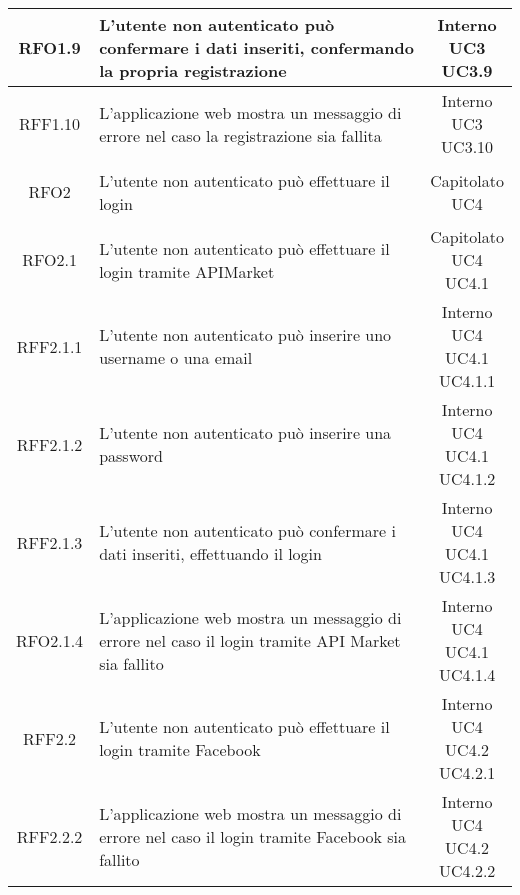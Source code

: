 \begin{longtable}{|c|p{8cm}|c|}
\hline
\hypertarget{RFO1.9}{RFO1.9} & L'utente non autenticato può confermare i dati inseriti, confermando la propria registrazione & \makecell*{Interno\\UC3\\UC3.9} \\
\hline
\hypertarget{RFF1.10}{RFF1.10} & L'applicazione web mostra un messaggio di errore nel caso la registrazione sia fallita & \makecell*{Interno\\UC3\\UC3.10} \\
\hline

\hypertarget{RFO2}{RFO2} & L'utente non autenticato può effettuare il login & \makecell*{Capitolato\\UC4} \\
\hline

\hypertarget{RFO2.1}{RFO2.1} & L'utente non autenticato può effettuare il login tramite APIMarket & \makecell*{Capitolato\\UC4\\UC4.1} \\
\hline

\hypertarget{RFF2.1.1}{RFF2.1.1} & L'utente non autenticato può inserire uno username o una email & \makecell*{Interno\\UC4\\UC4.1\\UC4.1.1} \\
\hline
\hypertarget{RFF2.1.2}{RFF2.1.2} & L'utente non autenticato può inserire una password & \makecell*{Interno\\UC4\\UC4.1\\UC4.1.2} \\
\hline
\hypertarget{RFF2.1.3}{RFF2.1.3} & L'utente non autenticato può confermare i dati inseriti, effettuando il login & \makecell*{Interno\\UC4\\UC4.1\\UC4.1.3} \\
\hline
\hypertarget{RFO2.1.4}{RFO2.1.4} & L'applicazione web mostra un messaggio di errore nel caso il login tramite API Market sia fallito & \makecell*{Interno\\UC4\\UC4.1\\UC4.1.4} \\
\hline

\hypertarget{RFF2.2}{RFF2.2} & L'utente non autenticato può effettuare il login tramite Facebook & \makecell*{Interno\\UC4\\UC4.2\\UC4.2.1} \\
\hline
\hypertarget{RFF2.2.2}{RFF2.2.2} & L'applicazione web mostra un messaggio di errore nel caso il login tramite Facebook sia fallito & \makecell*{Interno\\UC4\\UC4.2\\UC4.2.2} \\
\hline


\end{longtable}

